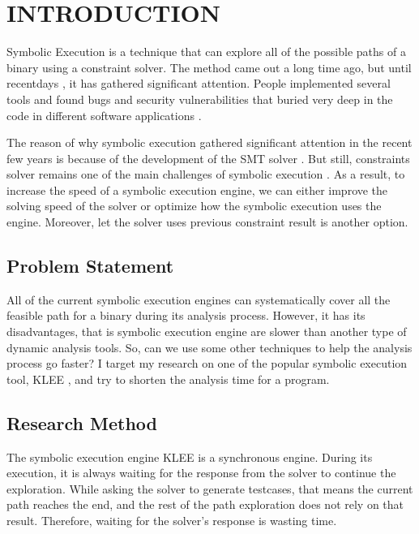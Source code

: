 \chapter{INTRODUCTION}%

Symbolic Execution \cite{King:1976:SEP:360248.360252} is a technique that can explore all of the possible paths of a binary using a constraint solver. The method came out a long time ago, but until recentdays \cite{symbolic-execution}, it has gathered significant attention. People implemented several tools and found bugs and security vulnerabilities that buried very deep in the code in different software applications \cite{sybolic-execution-in-practice}.

The reason of why symbolic execution gathered significant attention in the recent few years is because of the development of the SMT solver \cite{DeMoura:2011:SMT:1995376.1995394}. But still, constraints solver remains one of the main challenges of symbolic execution \cite{multi-solver-support}. As a result, to increase the speed of a symbolic execution engine, we can either improve the solving speed of the solver or optimize how the symbolic execution uses the engine. Moreover, let the solver uses previous constraint result is another option. 

\section{Problem Statement}
All of the current symbolic execution engines can systematically cover all the feasible path for a binary during its analysis process. However, it has its disadvantages, that is symbolic execution engine are slower than another type of dynamic analysis tools. So, can we use some other techniques to help the analysis process go faster? I target my research on one of the popular symbolic execution tool, KLEE \cite{Cadar:2008:KUA:1855741.1855756}, and try to shorten the analysis time for a program.

\section{Research Method}

The symbolic execution engine KLEE is a synchronous engine. During its execution, it is always waiting for the response from the solver to continue the exploration. While asking the solver to generate testcases, that means the current path reaches the end, and the rest of the path exploration does not rely on that result. Therefore, waiting for the solver's response is wasting time. 


